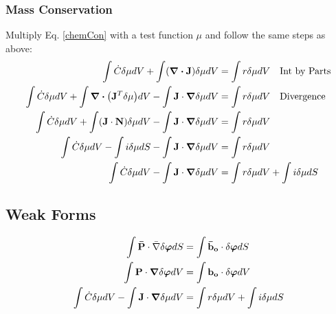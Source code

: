 \documentclass[12pt,3p]{article}
\numberwithin{equation}{section}
\begin{document}
\subsubsection{Mass Conservation}
Multiply Eq. \ref{chemCon} with a test function $\mu$ and follow the same steps as above: 
\begin{align*}
\int {\dot{C}} \delta \mu dV + \int ( \div \mathbf{J}) \delta \mu dV &= \int r \delta \mu dV \quad \text{Int by Parts} \\ 
\int {\dot{C}} \delta \mu dV + \int \div (\mathbf{J}^T \delta \mu) dV - \int \mathbf{J} \cdot \grad \delta \mu dV &= \int r \delta \mu dV \quad \text{Divergence} \\
 \int {\dot{C}} \delta \mu dV + \int (\mathbf{J} \cdot \mathbf{N}) \delta \mu dV - \int \mathbf{J} \cdot \grad \delta \mu dV &= \int r \delta \mu dV \\
 \int {\dot{C}} \delta \mu dV - \int i \delta \mu dS - \int \mathbf{J} \cdot \grad \delta \mu dV &= \int r \delta \mu dV \\
 \int {\dot{C}} \delta \mu dV - \int \mathbf{J} \cdot \grad \delta \mu dV &= \int r \delta \mu dV + \int i \delta \mu dS 
\end{align*}

\subsection{Weak Forms}
\begin{align*}
\int \mathbf{\bar{P}} \cdot \bar{\nabla} \delta \boldsymbol\varphi dS  &= \int \mathbf{\bar{b}_o} \cdot \delta \boldsymbol\varphi dS \\
\int \mathbf{P} \cdot \grad \delta \boldsymbol\varphi dV &= \int \mathbf{b_o} \cdot \delta \boldsymbol\varphi dV \\
\int {\dot{C}} \delta \mu dV - \int \mathbf{J} \cdot \grad \delta \mu dV &= \int r \delta \mu dV + \int i \delta \mu dS 
\end{align*}

\end{document}

